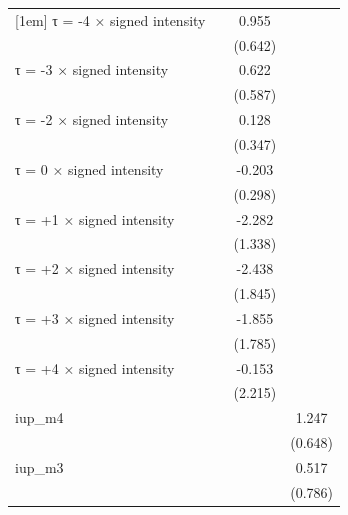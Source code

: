 \begin{table}[htbp]
\begin{tabular}{l*{3}{c}}
[1em]
τ = -4 × signed intensity&                     &       0.955         &                     \\
                    &                     &     (0.642)         &                     \\
[1em]
τ = -3 × signed intensity&                     &       0.622         &                     \\
                    &                     &     (0.587)         &                     \\
[1em]
τ = -2 × signed intensity&                     &       0.128         &                     \\
                    &                     &     (0.347)         &                     \\
[1em]
τ = 0 × signed intensity&                     &      -0.203         &                     \\
                    &                     &     (0.298)         &                     \\
[1em]
τ = +1 × signed intensity&                     &      -2.282\sym{*}  &                     \\
                    &                     &     (1.338)         &                     \\
[1em]
τ = +2 × signed intensity&                     &      -2.438         &                     \\
                    &                     &     (1.845)         &                     \\
[1em]
τ = +3 × signed intensity&                     &      -1.855         &                     \\
                    &                     &     (1.785)         &                     \\
[1em]
τ = +4 × signed intensity&                     &      -0.153         &                     \\
                    &                     &     (2.215)         &                     \\
[1em]
iup\_m4              &                     &                     &       1.247\sym{*}  \\
                    &                     &                     &     (0.648)         \\
[1em]
iup\_m3              &                     &                     &       0.517         \\
                    &                     &                     &     (0.786)         \\

\end{tabular}
\end{table}
